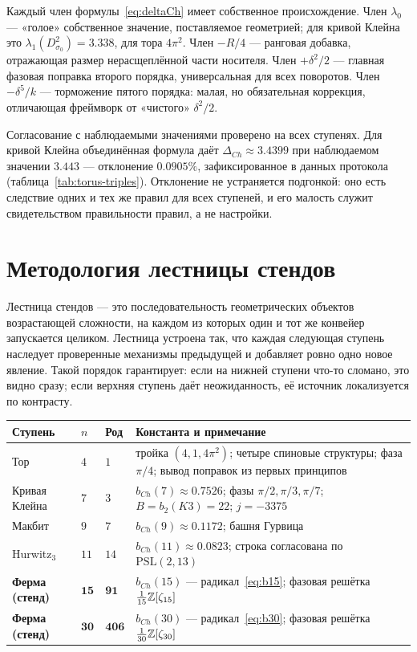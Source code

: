 Каждый член формулы~\eqref{eq:deltaCh} имеет собственное происхождение.
Член $\lambda_0$ — «голое» собственное значение, поставляемое
геометрией; для кривой Клейна это $\lambda_1(D^2_{\sigma_0})=3.338$,
для тора $4\pi^2$. Член $-R/4$ — ранговая добавка, отражающая размер
нерасщеплённой части носителя. Член $+\delta^2/2$ — главная фазовая
поправка второго порядка, универсальная для всех поворотов. Член
$-\delta^5/k$ — торможение пятого порядка: малая, но обязательная
коррекция, отличающая фреймворк от «чистого» $\delta^2/2$.

Согласование с наблюдаемыми значениями проверено на всех ступенях.
Для кривой Клейна объединённая формула даёт
$\Delta_{Ch}\approx3.4399$ при наблюдаемом значении $3.443$ —
отклонение $0.0905\%$, зафиксированное в данных протокола
(таблица~\ref{tab:torus-triples}). Отклонение не устраняется подгонкой:
оно есть следствие одних и тех же правил для всех ступеней, и его
малость служит свидетельством правильности правил, а не настройки.

\section{Методология лестницы стендов}\label{sec:ladder}

Лестница стендов — это последовательность геометрических объектов
возрастающей сложности, на каждом из которых один и тот же конвейер
запускается целиком. Лестница устроена так, что каждая следующая
ступень наследует проверенные механизмы предыдущей и добавляет ровно
одно новое явление. Такой порядок гарантирует: если на нижней ступени
что-то сломано, это видно сразу; если верхняя ступень даёт неожиданность,
её источник локализуется по контрасту.

\begin{center}
\small
\begin{tabularx}{\textwidth}{@{}l l l >{\raggedright\arraybackslash}X@{}}
\toprule
Ступень & $n$ & Род & Константа и примечание \\
\midrule
Тор & $4$ & $1$ & тройка $(4,1,4\pi^2)$; четыре спиновые структуры;
  фаза $\pi/4$; вывод поправок из первых принципов \\
Кривая Клейна & $7$ & $3$ & $b_{Ch}(7)\approx0.7526$; фазы
  $\pi/2,\pi/3,\pi/7$; $B=b_2(K3)=22$; $j=-3375$ \\
Макбит & $9$ & $7$ & $b_{Ch}(9)\approx0.1172$; башня Гурвица \\
Hurwitz$_3$ & $11$ & $14$ & $b_{Ch}(11)\approx0.0823$; строка согласована
  по $\mathrm{PSL}(2,13)$ \\
\textbf{Ферма (стенд)} & $\mathbf{15}$ & $\mathbf{91}$ &
  $b_{Ch}(15)$ — радикал~\eqref{eq:b15}; фазовая решётка
  $\tfrac1{15}\mathbb{Z}[\zeta_{15}]$ \\
\textbf{Ферма (стенд)} & $\mathbf{30}$ & $\mathbf{406}$ &
  $b_{Ch}(30)$ — радикал~\eqref{eq:b30}; фазовая решётка
  $\tfrac1{30}\mathbb{Z}[\zeta_{30}]$ \\
\bottomrule
\end{tabularx}
\end{center}

